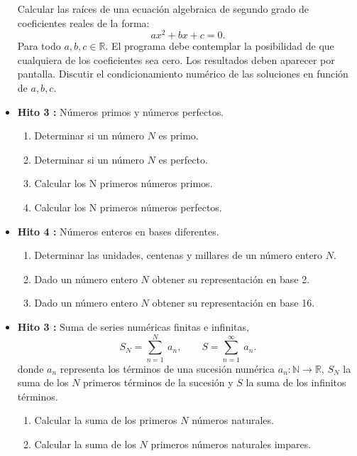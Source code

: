\documentclass[12pt,spanish]{article}
\begin{document}
\begin{itemize}
Calcular las raíces de una ecuación algebraica de segundo grado
de coeficientes reales de la forma: 
$$
a x^2 + b x + c = 0.
\label{ecuacion_segundo_grado}
$$
Para todo  $a, b, c \in \mathbb{R}$.
El programa debe contemplar la posibilidad de que cualquiera de los coeficientes
sea cero. Los resultados deben aparecer por pantalla. Discutir el 
condicionamiento numérico de las soluciones en función de $a, b, c $. 
 
\vspace{1cm}
\item {\bf Hito 3 :}    Números primos y números perfectos.  
\begin{enumerate} 
\item Determinar si un número $ N $ es primo. 
\item Determinar si un número $ N $ es perfecto. 
\item Calcular los N primeros números primos. 
\item Calcular los N primeros números perfectos. 
\end{enumerate}


\vspace{1cm}
\item {\bf Hito 4 :}  
Números enteros en bases diferentes. 
\begin{enumerate} 
\item Determinar las unidades, centenas y millares de un número entero $ N $. 
\item Dado un número entero $ N $ obtener su representación en base 2. 
\item Dado un número entero $ N $ obtener su representación en base 16. 
\end{enumerate}
 
 
\newpage 
\item {\bf Hito 3 :}   Suma de series numéricas finitas e infinitas,    
$$
   S_N = \sum_{n=1} ^{N} \ a_n, \qquad 
   S =  \sum_{n=1} ^{\infty} \ a_n.
$$ 
donde $ a_n $ representa  los términos de una sucesión numérica $ a_n: \mathbb{N} \rightarrow\mathbb{R}$,
$ S_N $ la suma de los $ N $ primeros términos de la sucesión y $ S $ la suma de los infinitos términos. 
                                                                         
\begin{enumerate}    
	\item Calcular la suma de los primeros $ N $  números naturales.	
	\item Calcular la suma de los $ N $  primeros números naturales impares.
	

\end{enumerate}
\end{itemize}
\end{document}
